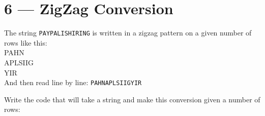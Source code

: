 \documentclass[a4paper,12pt]{article}
\begin{document}
\section{6 --- ZigZag Conversion}
The string \texttt{PAYPALISHIRING} is written in a zigzag pattern on a given number of rows like this: 
\\
P\hspace{1.5em}A\hspace{1.5em}H\hspace{1.5em}N
\\
A\hspace{0.5em}P\hspace{0.5em}L\hspace{0.5em}S\hspace{0.5em}I\hspace{0.5em}I\hspace{0.5em}G
\\
Y\hspace{1em}I\hspace{1em}R
\\
And then read line by line: \texttt{PAHNAPLSIIGYIR}
\par
Write the code that will take a string and make this conversion given a number of rows:
\end{document}
